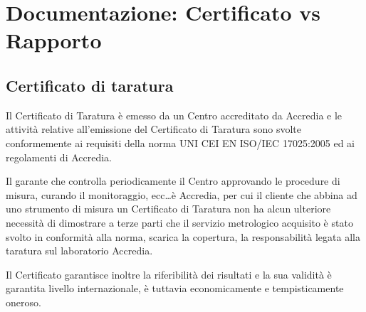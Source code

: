 \documentclass[a4paper, 15pt]{article}
\begin{document}
\section{Documentazione: Certificato vs Rapporto}
\subsection{Certificato di taratura}
\begin{adjustwidth}{2in}{}    		
   		Il Certificato di Taratura è emesso da un Centro accreditato da Accredia e le attività relative all’emissione del Certificato di Taratura sono svolte
   		conformemente ai requisiti della norma UNI CEI EN ISO/IEC 17025:2005 ed
   		ai regolamenti di Accredia.
   		
   		Il garante che controlla periodicamente il Centro approvando le
   		procedure di misura, curando il monitoraggio, ecc\dots è Accredia, per cui il cliente che abbina ad uno strumento di misura un Certificato di Taratura non
   		ha alcun ulteriore necessità di dimostrare a terze parti che il servizio
   		metrologico acquisito è stato svolto in conformità alla norma, scarica la copertura, la responsabilità legata alla taratura sul laboratorio Accredia. 
   		
   		Il Certificato garantisce inoltre la riferibilità dei risultati e la sua validità è garantita
   		livello internazionale, è tuttavia economicamente e tempisticamente oneroso.  
\end{adjustwidth}
\end{document}
